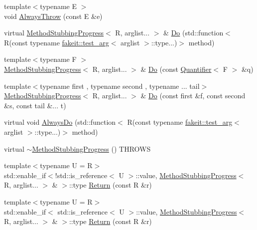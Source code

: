 \begin{DoxyCompactItemize}
\item 
{\footnotesize template$<$typename E $>$ }\\void \mbox{\hyperlink{structfakeit_1_1MethodStubbingProgress_a4efb736b0529123d9c5ed87630e11ac2}{Always\+Throw}} (const E \&e)
\item 
virtual \mbox{\hyperlink{structfakeit_1_1MethodStubbingProgress}{Method\+Stubbing\+Progress}}$<$ R, arglist... $>$ \& \mbox{\hyperlink{structfakeit_1_1MethodStubbingProgress_a9ef4c2db8e567aa312b708613d240ae1}{Do}} (std\+::function$<$ R(const typename \mbox{\hyperlink{structfakeit_1_1test__arg}{fakeit\+::test\+\_\+arg}}$<$ arglist $>$\+::type...)$>$ method)
\item 
{\footnotesize template$<$typename F $>$ }\\\mbox{\hyperlink{structfakeit_1_1MethodStubbingProgress}{Method\+Stubbing\+Progress}}$<$ R, arglist... $>$ \& \mbox{\hyperlink{structfakeit_1_1MethodStubbingProgress_a59f9d7ab7c86b809ce25b41d05b58ad2}{Do}} (const \mbox{\hyperlink{structfakeit_1_1Quantifier}{Quantifier}}$<$ F $>$ \&q)
\item 
{\footnotesize template$<$typename first , typename second , typename ... tail$>$ }\\\mbox{\hyperlink{structfakeit_1_1MethodStubbingProgress}{Method\+Stubbing\+Progress}}$<$ R, arglist... $>$ \& \mbox{\hyperlink{structfakeit_1_1MethodStubbingProgress_a157561400e37da65c5b48f4466fc603c}{Do}} (const first \&f, const second \&s, const tail \&... t)
\item 
virtual void \mbox{\hyperlink{structfakeit_1_1MethodStubbingProgress_a47464ab35cb06c00dbd00a13328b80a7}{Always\+Do}} (std\+::function$<$ R(const typename \mbox{\hyperlink{structfakeit_1_1test__arg}{fakeit\+::test\+\_\+arg}}$<$ arglist $>$\+::type...)$>$ method)
\item 
virtual \mbox{\hyperlink{structfakeit_1_1MethodStubbingProgress_aed2c96ce537706935976943354c49616}{$\sim$\+Method\+Stubbing\+Progress}} () T\+H\+R\+O\+WS
\item 
{\footnotesize template$<$typename U  = R$>$ }\\std\+::enable\+\_\+if$<$!std\+::is\+\_\+reference$<$ U $>$\+::value, \mbox{\hyperlink{structfakeit_1_1MethodStubbingProgress}{Method\+Stubbing\+Progress}}$<$ R, arglist... $>$ \& $>$\+::type \mbox{\hyperlink{structfakeit_1_1MethodStubbingProgress_ab97be63c322887db40cb788d28875fea}{Return}} (const R \&r)
\item 
{\footnotesize template$<$typename U  = R$>$ }\\std\+::enable\+\_\+if$<$ std\+::is\+\_\+reference$<$ U $>$\+::value, \mbox{\hyperlink{structfakeit_1_1MethodStubbingProgress}{Method\+Stubbing\+Progress}}$<$ R, arglist... $>$ \& $>$\+::type \mbox{\hyperlink{structfakeit_1_1MethodStubbingProgress_ab20141c6f552c3aa3399660c520c2ba4}{Return}} (const R \&r)

\end{DoxyCompactItemize}
